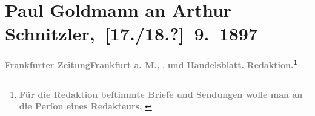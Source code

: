 

         
         \renewcommand{\erwaehntePersonen}{Personen:  ?? [Totgeborener Sohn von Arthur Schnitzler und Marie Reinhard], Richard Beer-Hofmann, Mirjam Beer-Hofmann, Paula Beer-Hofmann, Rosa Freudenthal, Marie Glümer, Paul Goldmann, Marie Reinhard, Josef Rosengart}
         \renewcommand{\erwaehnteInstitutionen}{Institutionen: Frankfurter Zeitung}
         \renewcommand{\erwaehnteOrte}{Orte: Frankfurt am Main, Mauer, Wien}
         \renewcommand{\erwaehnteWerke}{Werke: Tagebuch}
               \section[ Paul Goldmann an Arthur Schnitzler, {[}17./18.?{]} 9. 1897]{ Paul Goldmann an Arthur Schnitzler, {[}17./18.?{]} 9. 1897}\nopagebreak{}\rehead{ }\begin{ledgroupsized}[t]{13cm}\normalsize\beginnumbering \toendnotes[C]{\smallbreak\pagebreak[2]} 
\toendnotes[C]{\smallbreak}\pstart
           \noindent{}{\pb}\textcolor{gray}{\textbf{Frankfurter Zeitung}}\hfill \textcolor{gray}{\textbf{Frankfurt a. M.,}}{ }\label{K_L02825-1v}\label{K_L02825-1h}.\pend
           \pstart
           \textcolor{gray}{\textbf{und}}\pend
           \pstart
           \textcolor{gray}{\textbf{Handelsblatt.}}\pend
           \pstart
           \textcolor{gray}{\textbf{Redaktion.\footnote{\noindent{}\textcolor{gray}{\textbf{Für die Redaktion beſtimmte Briefe und Sendungen wolle man
                                  an die Perſon eines Redakteurs,
}}}}}
\end{ledgroupsized}
